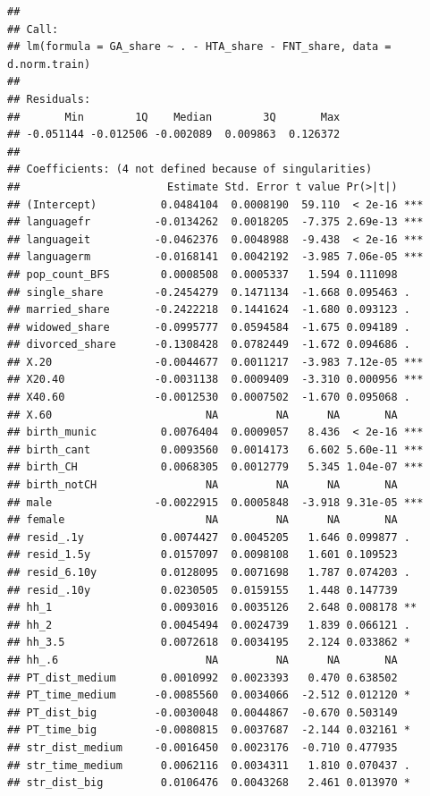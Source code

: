 \documentclass[
]{article}
\begin{document}
\begin{verbatim}
## 
## Call:
## lm(formula = GA_share ~ . - HTA_share - FNT_share, data = d.norm.train)
## 
## Residuals:
##       Min        1Q    Median        3Q       Max 
## -0.051144 -0.012506 -0.002089  0.009863  0.126372 
## 
## Coefficients: (4 not defined because of singularities)
##                       Estimate Std. Error t value Pr(>|t|)    
## (Intercept)          0.0484104  0.0008190  59.110  < 2e-16 ***
## languagefr          -0.0134262  0.0018205  -7.375 2.69e-13 ***
## languageit          -0.0462376  0.0048988  -9.438  < 2e-16 ***
## languagerm          -0.0168141  0.0042192  -3.985 7.06e-05 ***
## pop_count_BFS        0.0008508  0.0005337   1.594 0.111098    
## single_share        -0.2454279  0.1471134  -1.668 0.095463 .  
## married_share       -0.2422218  0.1441624  -1.680 0.093123 .  
## widowed_share       -0.0995777  0.0594584  -1.675 0.094189 .  
## divorced_share      -0.1308428  0.0782449  -1.672 0.094686 .  
## X.20                -0.0044677  0.0011217  -3.983 7.12e-05 ***
## X20.40              -0.0031138  0.0009409  -3.310 0.000956 ***
## X40.60              -0.0012530  0.0007502  -1.670 0.095068 .  
## X.60                        NA         NA      NA       NA    
## birth_munic          0.0076404  0.0009057   8.436  < 2e-16 ***
## birth_cant           0.0093560  0.0014173   6.602 5.60e-11 ***
## birth_CH             0.0068305  0.0012779   5.345 1.04e-07 ***
## birth_notCH                 NA         NA      NA       NA    
## male                -0.0022915  0.0005848  -3.918 9.31e-05 ***
## female                      NA         NA      NA       NA    
## resid_.1y            0.0074427  0.0045205   1.646 0.099877 .  
## resid_1.5y           0.0157097  0.0098108   1.601 0.109523    
## resid_6.10y          0.0128095  0.0071698   1.787 0.074203 .  
## resid_.10y           0.0230505  0.0159155   1.448 0.147739    
## hh_1                 0.0093016  0.0035126   2.648 0.008178 ** 
## hh_2                 0.0045494  0.0024739   1.839 0.066121 .  
## hh_3.5               0.0072618  0.0034195   2.124 0.033862 *  
## hh_.6                       NA         NA      NA       NA    
## PT_dist_medium       0.0010992  0.0023393   0.470 0.638502    
## PT_time_medium      -0.0085560  0.0034066  -2.512 0.012120 *  
## PT_dist_big         -0.0030048  0.0044867  -0.670 0.503149    
## PT_time_big         -0.0080815  0.0037687  -2.144 0.032161 *  
## str_dist_medium     -0.0016450  0.0023176  -0.710 0.477935    
## str_time_medium      0.0062116  0.0034311   1.810 0.070437 .  
## str_dist_big         0.0106476  0.0043268   2.461 0.013970 *  

\end{verbatim}
\end{document}
